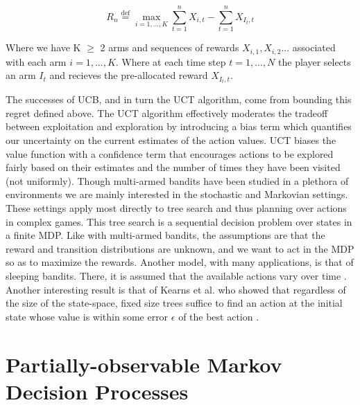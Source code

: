 \documentclass[msc, deptreport, ai, romanprepages]{infthesis}
\newcommand*{\defeq}{\stackrel{\text{def}}{=}}
\begin{document}
\begin{equation}
R_n \defeq \max_{i=1,...,K} \sum_{t=1}^n X_{i,t} - \sum_{t=1}^n X_{I_t,t}
\end{equation}

Where we have K \(\geq\) 2 arms and sequences of rewards \(X_{i,1},X_{i,2}...\) associated with each arm \( i = 1,...,K\). Where at each time step \( t=1,...,N\) the player selects an arm \(I_t\) and recieves the pre-allocated reward \(X_{I_t,t}\).

The successes of UCB, and in turn the UCT algorithm, come from bounding this regret defined above. The UCT algorithm effectively moderates the tradeoff between exploitation and exploration by introducing a bias term which quantifies our uncertainty on the current estimates of the action values. UCT biases the value function with a confidence term that encourages actions to be explored fairly based on their estimates and the number of times they have been visited (not uniformly).
Though multi-armed bandits have been studied in a plethora of environments we are mainly interested in the stochastic and Markovian settings. These settings apply most directly to tree search and thus planning over actions in complex games. This tree search is a sequential decision problem over states in a finite MDP. Like with multi-armed bandits, the assumptions are that the reward and transition distributions are unknown, and we want to act in the MDP so as to maximize the rewards. Another model, with many applications, is that of sleeping bandits. There, it is assumed that the available actions vary over time \cite{regretAnalysis}. Another interesting result is that of Kearns et al. who showed that regardless of the size of the state-space, fixed size trees suffice to find an action at the initial state whose value is within some error \(\epsilon\) of the best action \cite{Kearns2002}.

\section{Partially-observable Markov Decision Processes}
\end{document}
